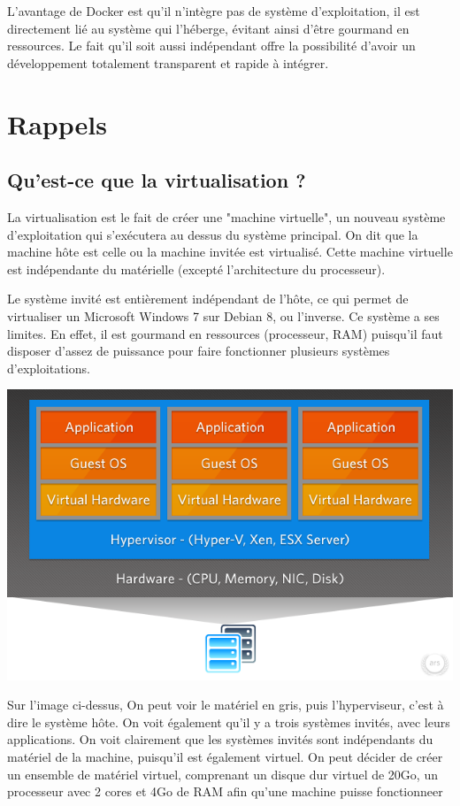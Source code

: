 \documentclass[12pt,a4paper]{article}
\begin{document}
L'avantage de Docker est qu'il n'intègre pas de système d'exploitation, il est directement lié au système qui l'héberge, évitant ainsi d'être gourmand en ressources. Le fait qu'il soit aussi indépendant offre la possibilité d'avoir un développement totalement transparent et rapide à intégrer. 

\section{Rappels}

\subsection{Qu'est-ce que la virtualisation ?}

La virtualisation est le fait de créer une "machine virtuelle", un nouveau système d'exploitation qui s'exécutera au dessus du système principal. On dit que la machine hôte est celle ou la machine invitée est virtualisé. Cette machine virtuelle est indépendante du matérielle (excepté l'architecture du processeur).

Le système invité est entièrement indépendant de l'hôte, ce qui permet de virtualiser un Microsoft Windows 7 sur Debian 8, ou l'inverse. Ce système a ses limites. En effet, il est gourmand en ressources (processeur, RAM) puisqu'il faut disposer d'assez de puissance pour faire fonctionner plusieurs systèmes d'exploitations.

\begin{center}
  \includegraphics[width=15cm]{images_rapport/virtualisation.jpg}
\end{center}

Sur l'image ci-dessus, On peut voir le matériel en gris, puis l'hyperviseur, c'est à dire le système hôte. On voit également qu'il y a trois systèmes invités, avec leurs applications. On voit clairement que les systèmes invités sont indépendants du matériel de la machine, puisqu'il est également virtuel. On peut décider de créer un ensemble de matériel virtuel, comprenant un disque dur virtuel de 20Go, un processeur avec 2 cores et 4Go de RAM afin qu'une machine puisse fonctionneer
\end{document}
